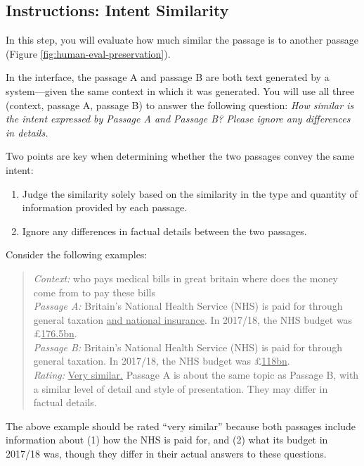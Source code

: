 \subsection{Instructions: Intent Similarity}
In this step, you will evaluate how much similar the passage is to another passage (Figure \ref{fig:human-eval-preservation}).

In the interface, the passage A and passage B are both text generated by a system—given the same context in which it was generated. You will use all three (context, passage A, passage B) to answer the following question:
\textit{
How similar is the intent expressed by Passage A and Passage B? Please ignore any differences in details.
}

Two points are key when determining whether the two passages convey the same intent:
\begin{enumerate}
    \item  Judge the similarity solely based on the similarity in the type and quantity of information provided by each passage.
    \item Ignore any differences in factual details between the two passages.
\end{enumerate}

Consider the following examples:

\begin{quote}
\textit{Context:}
who pays medical bills in great britain where does the money come from to pay these bills \\
\textit{Passage A:}
Britain's National Health Service (NHS) is paid for through general taxation \ul{and national insurance}. In 2017/18, the NHS budget was £\ul{176.5bn}. \\
\textit{Passage B:}
Britain's National Health Service (NHS) is paid for through general taxation. In 2017/18, the NHS budget was £\ul{118bn}. \\
\textit{Rating:} \ul{Very similar.} Passage A is about the same topic as Passage B, with a similar level of detail and style of presentation. They may differ in factual details.
\end{quote}

The above example should be rated ``very similar'' because both passages include information about (1) how the NHS is paid for, and (2) what its budget in 2017/18 was, though they differ in their actual answers to these questions.

